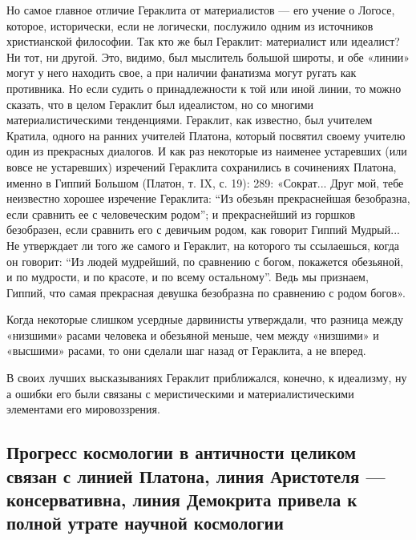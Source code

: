 Но самое главное  отличие Гераклита от материалистов ---  его учение о
Логосе,  которое,  исторически,  если не  логически,  послужило  одним
из  источников  христианской  философии.  Так  кто  же  был  Гераклит:
материалист  или  идеалист?  Ни  тот,  ни  другой.  Это,  видимо,  был
мыслитель большой широты, и обе «линии»  могут у него находить свое, а
при наличии  фанатизма могут ругать  как противника. Но если  судить о
принадлежности  к  той  или  иной  линии,  то  можно  сказать,  что  в
целом  Гераклит  был  идеалистом, но  со  многими  материалистическими
тенденциями. Гераклит,  как известно, был учителем  Кратила, одного на
ранних  учителей  Платона, который  посвятил  своему  учителю один  из
прекрасных диалогов. И  как раз некоторые из  наименее устаревших (или
вовсе  не устаревших)  изречений  Гераклита  сохранились в  сочинениях
Платона,  именно  в  Гиппий  Большом  (Платон, т.  IX,  с.  19):  289:
«Сократ... Друг мой, тебе неизвестно хорошее изречение Гераклита: ``Из
обезьян  прекраснейшая безобразна,  если  сравнить  ее с  человеческим
родом''; и  прекраснейший из горшков  безобразен, если сравнить  его с
девичьим родом, как говорит Гиппий  Мудрый... Не утверждает ли того же
самого и Гераклит,  на которого ты ссылаешься, когда  он говорит: ``Из
людей  мудрейший, по  сравнению  с богом,  покажется  обезьяной, и  по
мудрости, и  по красоте,  и по всему  остальному''. Ведь  мы признаем,
Гиппий, что самая  прекрасная девушка безобразна по  сравнению с родом
богов».

Когда некоторые  слишком усердные  дарвинисты утверждали,  что разница
между  «низшими»  расами  человека   и  обезьяной  меньше,  чем  между
«низшими» и «высшими» расами, то они сделали шаг назад от Гераклита, а
не вперед.

В  своих   лучших  высказываниях  Гераклит  приближался,   конечно,  к
идеализму,  ну   а  ошибки  его   были  связаны  с   меристическими  и
материалистическими элементами его мировоззрения.

\subsection{Прогресс космологии  в античности целиком связан  с линией
Платона, линия Аристотеля --- консервативна, линия Демокрита привела к
полной утрате научной космологии}

